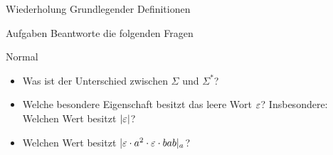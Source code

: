 
{
\begin{frame}[fragile]{Wiederholung Grundlegender Definitionen}
    \begin{alertblock}{Aufgaben}
        Beantworte die folgenden Fragen
    \end{alertblock}
    \begin{block}{Normal}
        \begin{itemize}
            \item Was ist der Unterschied zwischen $\Sigma$ und $\Sigma^*$?
            \item Welche besondere Eigenschaft besitzt das leere Wort $\varepsilon$? Insbesondere: Welchen Wert besitzt $|\varepsilon|$?
            \item Welchen Wert besitzt $|\varepsilon \cdot a^2 \cdot \varepsilon \cdot bab|_a$?
        \end{itemize}
    \end{block}
\end{frame}
}

